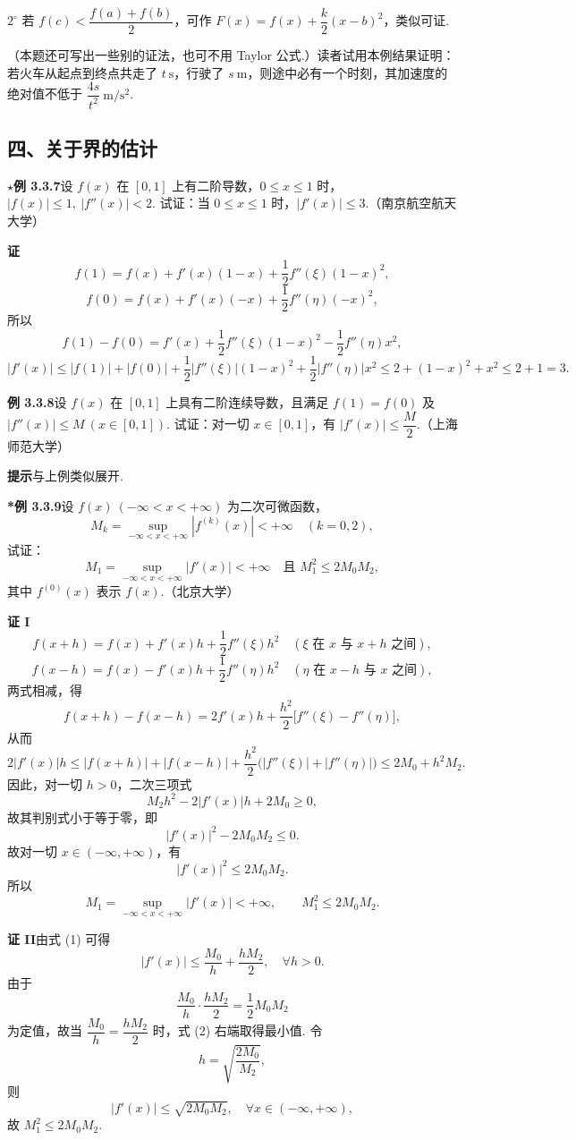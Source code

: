 \documentclass[UTF8,12pt,a4paper,fontset=fandol]{ctexart}
\begin{document}
$2^\circ$ 若 $f(c)<\dfrac{f(a)+f(b)}2$，可作 $F(x)=f(x)+\dfrac{k}{2}(x-b)^2$，类似可证.

（本题还可写出一些别的证法，也可不用 Taylor 公式.）读者试用本例结果证明：若火车从起点到终点共走了 $t\ \mathrm s$，行驶了 $s\ \mathrm m$，则途中必有一个时刻，其加速度的绝对值不低于 $\dfrac{4s}{t^2}\ \mathrm{m/s^2}$.

\subsection*{四、关于界的估计}

\noindent\textbf{$\star$例 3.3.7}\quad 设 $f(x)$ 在 $[0,1]$ 上有二阶导数，$0\le x\le1$ 时，$|f(x)|\le1,\ |f''(x)|<2$. 试证：当 $0\le x\le1$ 时，$|f'(x)|\le3$.（南京航空航天大学）

\noindent\textbf{证}\quad
\[
  f(1)=f(x)+f'(x)(1-x)+\frac12f''(\xi)(1-x)^2,
\]
\[
  f(0)=f(x)+f'(x)(-x)+\frac12f''(\eta)(-x)^2,
\]
所以
\[
  f(1)-f(0)=f'(x)+\frac12f''(\xi)(1-x)^2-\frac12f''(\eta)x^2,
\]
\[
  |f'(x)|\le |f(1)|+|f(0)|+\frac12|f''(\xi)|(1-x)^2+\frac12|f''(\eta)|x^2
  \le2+(1-x)^2+x^2\le2+1=3.
\]

\noindent\textbf{例 3.3.8}\quad 设 $f(x)$ 在 $[0,1]$ 上具有二阶连续导数，且满足 $f(1)=f(0)$ 及 $|f''(x)|\le M\ (x\in[0,1])$. 试证：对一切 $x\in[0,1]$，有 $|f'(x)|\le\dfrac M2$.（上海师范大学）

\noindent\textbf{提示}\quad 与上例类似展开.

\noindent\textbf{*例 3.3.9}\quad 设 $f(x)\ (-\infty<x<+\infty)$ 为二次可微函数，
\[
  M_k=\sup_{-\infty<x<+\infty}|f^{(k)}(x)|<+\infty\quad(k=0,2),
\]
试证：
\[
  M_1=\sup_{-\infty<x<+\infty}|f'(x)|<+\infty\quad\text{且 }M_1^2\le2M_0M_2,
\]
其中 $f^{(0)}(x)$ 表示 $f(x)$.（北京大学）

\noindent\textbf{证 I}\quad
\[
  f(x+h)=f(x)+f'(x)h+\frac12f''(\xi)h^2\quad(\xi\text{ 在 }x\text{ 与 }x+h\text{ 之间}),
\]
\[
  f(x-h)=f(x)-f'(x)h+\frac12f''(\eta)h^2\quad(\eta\text{ 在 }x-h\text{ 与 }x\text{ 之间}),
\]
两式相减，得
\[
  f(x+h)-f(x-h)=2f'(x)h+\frac{h^2}{2}\bigl[f''(\xi)-f''(\eta)\bigr],
\]
从而
\[
  2|f'(x)|h\le |f(x+h)|+|f(x-h)|+\frac{h^2}{2}\bigl(|f''(\xi)|+|f''(\eta)|\bigr)
  \le 2M_0+h^2M_2. \tag{1}
\]
因此，对一切 $h>0$，二次三项式
\[
  M_2h^2-2|f'(x)|h+2M_0\ge0,
\]
故其判别式小于等于零，即
\[
  |f'(x)|^2-2M_0M_2\le0.
\]
故对一切 $x\in(-\infty,+\infty)$，有
\[
  |f'(x)|^2\le2M_0M_2.
\]
所以
\[
  M_1=\sup_{-\infty<x<+\infty}|f'(x)|<+\infty,\qquad M_1^2\le2M_0M_2.
\]

\noindent\textbf{证 II}\quad 由式 (1) 可得
\[
  |f'(x)|\le \frac{M_0}{h}+\frac{hM_2}{2},\quad \forall h>0. \tag{2}
\]
由于
\[
  \frac{M_0}{h}\cdot\frac{hM_2}{2}=\frac12M_0M_2
\]
为定值，故当 $\dfrac{M_0}{h}=\dfrac{hM_2}{2}$ 时，式 (2) 右端取得最小值. 令
\[
  h=\sqrt{\frac{2M_0}{M_2}},
\]
则
\[
  |f'(x)|\le\sqrt{2M_0M_2},\quad \forall x\in(-\infty,+\infty),
\]
故 $M_1^2\le2M_0M_2$.
\end{document}
